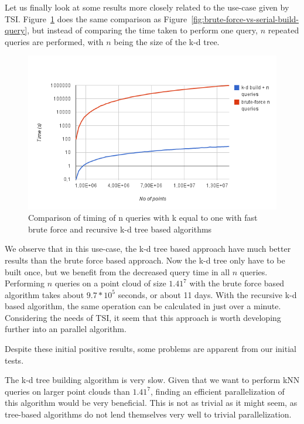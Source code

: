 Let us finally look at some results more closely related to the use-case given by TSI\@. Figure~\ref{fig:brute-force-vs-serial-build-n-queries} does the same comparison as Figure~\ref{fig:brute-force-vs-serial-build-query}, but instead of comparing the time taken to perform one query, $n$ repeated queries are performed, with $n$ being the size of the k-d tree.

\begin{figure}[ht!]
    \centering
    \includegraphics[width=120mm]{../gfx/brute-force-vs-serial-build-n-queries.png}
    \caption{Comparison of timing of n queries with k equal to one with fast brute force and recursive k-d tree based algorithms}
    \label{fig:brute-force-vs-serial-build-n-queries}
\end{figure}

We observe that in this use-case, the k-d tree based approach have much better results than the brute force based approach. Now the k-d tree only have to be built once, but we benefit from the decreased query time in all $n$ queries. Performing $n$ queries on a point cloud of size $1.41^7$ with the brute force based algorithm takes about $9.7*10^5$ seconds, or about 11 days. With the recursive k-d based algorithm, the same operation can be calculated in just over a minute. Considering the needs of TSI, it seem that this approach is worth developing further into an parallel algorithm.

Despite these initial positive results, some problems are apparent from our initial tests.

The k-d tree building algorithm is very slow. Given that we want to perform kNN queries on larger point clouds than $1.41^7$, finding an efficient parallelization of this algorithm would be very beneficial. This is not as trivial as it might seem, as tree-based algorithms do not lend themselves very well to trivial parallelization.

